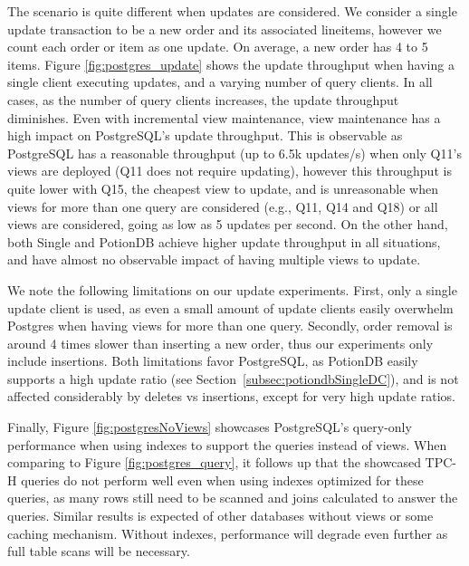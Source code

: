 \documentclass[sigplan,twocolumn,review,anonymous]{acmart}
\begin{document}
The scenario is quite different when updates are considered.
We consider a single update transaction to be a new order and its associated lineitems, however we count each order or item as one update.
On average, a new order has 4 to 5 items.
Figure \ref{fig:postgres_update} shows the update throughput when having a single client executing updates, and a varying number of query clients.
In all cases, as the number of query clients increases, the update throughput diminishes. %
Even with incremental view maintenance, view maintenance has a high impact on PostgreSQL's update throughput.
This is observable as PostgreSQL has a reasonable throughput (up to 6.5k updates/s) when only Q11's views are deployed (Q11 does not require updating), however this throughput is quite lower with Q15, the cheapest view to update, and is unreasonable when views for more than one query are considered (e.g., Q11, Q14 and Q18) or all views are considered, going as low as 5 updates per second.
On the other hand, both Single and PotionDB achieve higher update throughput in all situations, and have almost no observable impact of having multiple views to update. %

We note the following limitations on our update experiments.
First, only a single update client is used, as even a small amount of update clients easily overwhelm Postgres when having views for more than one query. %
Secondly, order removal is around 4 times slower than inserting a new order, thus our experiments only include insertions.
Both limitations favor PostgreSQL, as PotionDB easily supports a high update ratio (see Section~\ref{subsec:potiondbSingleDC}), and is not affected considerably by deletes vs insertions, except for very high update ratios. %

Finally, Figure \ref{fig:postgresNoViews} showcases PostgreSQL's query-only performance when using indexes to support the queries instead of views.
When comparing to Figure \ref{fig:postgres_query}, it follows up that the showcased TPC-H queries do not perform well even when using indexes optimized for these queries, as many rows still need to be scanned and joins calculated to answer the queries. %
Similar results is expected of other databases without views or some caching  mechanism.
Without indexes, performance will degrade even further as full table scans will be necessary.
\end{document}
